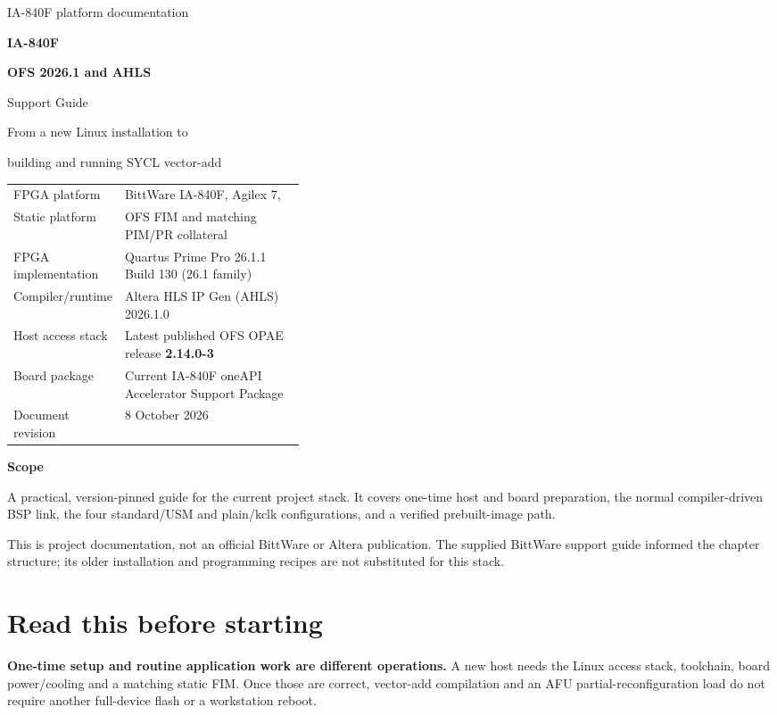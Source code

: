 \documentclass[11pt,letterpaper]{article}
\newcommand{\code}[1]{{\ttfamily\expandafter\seqsplit\expandafter{\detokenize{#1}}}}
\newcommand{\src}[1]{\cite{S#1}}
\begin{document}
\begin{titlepage}
\vspace*{0.5in}
{\large\color{GuideBlue} IA-840F platform documentation\par}
\vspace{0.35in}
{\Huge\bfseries IA-840F\par}
\vspace{0.12in}
{\LARGE\bfseries OFS 2026.1 and AHLS\par Support Guide\par}
\vspace{0.4in}
{\Large From a new Linux installation to\par building and running SYCL vector-add\par}
\vspace{0.45in}
\par\noindent\begin{tabularx}{\linewidth}{@{}p{0.38\linewidth}Y@{}}
\toprule
FPGA platform & BittWare IA-840F, Agilex 7, \code{AGFB027R25A2E2V}\\
Static platform & OFS \code{ofs-2026.1-1} FIM and matching PIM/PR collateral\\
FPGA implementation & Quartus Prime Pro 26.1.1 Build 130 (26.1 family)\\
Compiler/runtime & Altera HLS IP Gen (AHLS) 2026.1.0\\
Host access stack & Latest published OFS OPAE release \textbf{2.14.0-3}\\
Board package & Current IA-840F oneAPI Accelerator Support Package\\
Document revision & 8 October 2026\\
\bottomrule
\end{tabularx}\par
\vfill
\textbf{Scope}\par
A practical, version-pinned guide for the current project stack. It covers one-time
host and board preparation, the normal compiler-driven BSP link, the four
standard/USM and plain/kclk configurations, and a verified prebuilt-image path.

This is project documentation, not an official BittWare or Altera publication.
The supplied BittWare support guide informed the chapter structure; its older
installation and programming recipes are not substituted for this stack.\src{1}
\end{titlepage}
\tableofcontents
\clearpage
\section*{Read this before starting}
\textbf{One-time setup and routine application work are different operations.}
A new host needs the Linux access stack, toolchain, board power/cooling and a
matching static FIM. Once those are correct, vector-add compilation and an AFU
partial-reconfiguration load do not require another full-device flash or a
workstation reboot.
\end{document}
